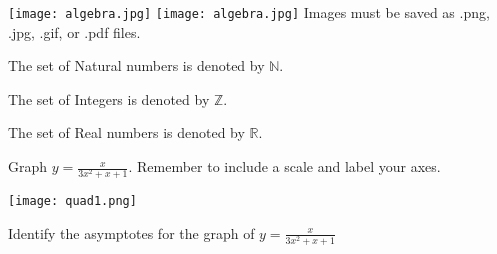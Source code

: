 \documentclass[11pt]{article}
\def\eq1{y=\frac{x}{3x^2+x+1}}
\def\labelaxes{Remember to include a scale and label your axes.}
\begin{document}
\begin{center}
\texttt{[image: algebra.jpg]}
\texttt{[image: algebra.jpg]}
Images must be saved as .png, .jpg, .gif, or .pdf files.
\end{center}

The set of Natural numbers is denoted by
$\mathbb{N}$.

The set of Integers is denoted by $\mathbb{Z}$.

The set of Real numbers is denoted by $\mathbb{R}$.

Graph $\eq1$. \labelaxes

\texttt{[image: quad1.png]}

Identify the asymptotes for the graph of $\eq1$
\end{document}
